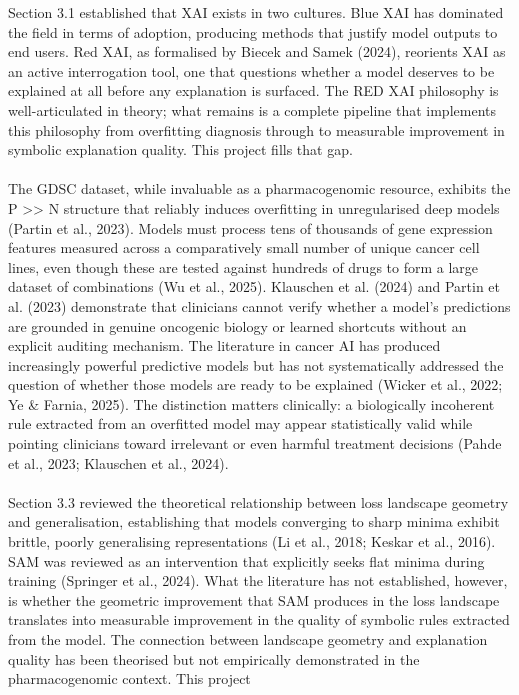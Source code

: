 Section 3.1 established that XAI exists in two cultures. Blue XAI has dominated the field in terms of adoption, 
producing methods that justify model outputs to end users. Red XAI, as formalised by Biecek and Samek (2024), 
reorients XAI as an active interrogation tool, one that questions whether a model deserves to be explained at 
all before any explanation is surfaced. The RED XAI philosophy is well-articulated in theory; what remains is a 
complete pipeline that implements this philosophy from overfitting diagnosis through to measurable improvement 
in symbolic explanation quality. This project fills that gap.
\\\\
The GDSC dataset, while invaluable as a pharmacogenomic resource, exhibits the P >> N structure that reliably 
induces overfitting in unregularised deep models (Partin et al., 2023). Models must process tens of thousands 
of gene expression features measured across a comparatively small number of unique cancer cell lines, even 
though these are tested against hundreds of drugs to form a large dataset of combinations (Wu et al., 2025). 
Klauschen et al. (2024) and Partin et al. (2023) demonstrate that clinicians cannot verify whether a model's 
predictions are grounded in genuine oncogenic biology or learned shortcuts without an explicit auditing 
mechanism. The literature in cancer AI has produced increasingly powerful predictive models but has not 
systematically addressed the question of whether those models are ready to be explained 
(Wicker et al., 2022; Ye \& Farnia, 2025). The distinction matters clinically: a biologically incoherent rule 
extracted from an overfitted model may appear statistically valid while pointing clinicians toward irrelevant 
or even harmful treatment decisions (Pahde et al., 2023; Klauschen et al., 2024).
\\\\
Section 3.3 reviewed the theoretical relationship between loss landscape geometry and generalisation, 
establishing that models converging to sharp minima exhibit brittle, poorly generalising representations 
(Li et al., 2018; Keskar et al., 2016). SAM was reviewed as an intervention that explicitly seeks flat minima 
during training (Springer et al., 2024). What the literature has not established, however, is whether the 
geometric improvement that SAM produces in the loss landscape translates into measurable improvement in the 
quality of symbolic rules extracted from the model. The connection between landscape geometry and explanation 
quality has been theorised but not empirically demonstrated in the pharmacogenomic context. This project 
